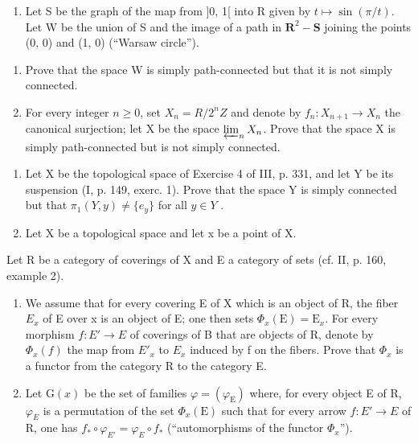 \exercisegroup

\begin{enumerate}
\def\labelenumi{\arabic{enumi})}
\tightlist
\item
  Let S be the graph of the map from ]0, 1[ into R given by \(t \mapsto \sin(\pi/t)\). Let W be the union of S and the image of a path in \(\mathbf{R}^2 - \mathbf{S}\) joining the points (0, 0) and (1, 0) (“Warsaw circle”).
\end{enumerate}

\begin{enumerate}
\def\labelenumi{\alph{enumi})}
\item
  Prove that the space W is simply path-connected but that it is not simply connected.
\item
  For every integer \(n \geqslant 0\), set \(X_{n} = R/2^{n}Z\) and denote by \(f_{n}: X_{n+1} \to X_{n}\) the canonical surjection; let X be the space \(\varprojlim_{n} X_{n}\). Prove that the space X is simply path-connected but is not simply connected.
\end{enumerate}

\begin{enumerate}
\def\labelenumi{\arabic{enumi})}
\setcounter{enumi}{1}
\item
  Let X be the topological space of Exercise 4 of III, p. 331, and let Y be its suspension (I, p. 149, exerc. 1). Prove that the space Y is simply connected but that \(\pi_1(Y, y) \neq \{e_y\}\) for all \(y \in Y\) .
\item
  Let X be a topological space and let x be a point of X.
\end{enumerate}

Let R be a category of coverings of X and E a category of sets (cf. II, p. 160, example 2).

\begin{enumerate}
\def\labelenumi{\alph{enumi})}
\item
  We assume that for every covering E of X which is an object of R, the fiber \(E_{x}\) of E over x is an object of E; one then sets \(\Phi_{x}(\mathrm{E}) = \mathrm{E}_{x}\). For every morphism \(f: E' \to E\) of coverings of B that are objects of R, denote by \(\Phi_{x}(f)\) the map from \(E'_{x}\) to \(E_{x}\) induced by f on the fibers. Prove that \(\Phi_{x}\) is a functor from the category R to the category E.
\item
  Let \(\mathrm{G}(x)\) be the set of families \(\varphi = (\varphi_{\mathrm{E}})\) where, for every object E of R, \(\varphi_{E}\) is a permutation of the set \(\Phi_{x}(\mathrm{E})\) such that for every arrow \(f: E' \to E\) of R, one has \(f_{*} \circ \varphi_{E'} = \varphi_{E} \circ f_{*}\) (“automorphisms of the functor \(\Phi_{x}\)”).
\end{enumerate}

